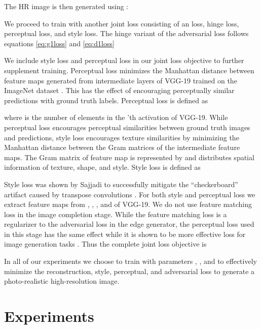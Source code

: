 \documentclass[10pt,twocolumn,letterpaper]{article}
\begin{document}
The HR image is then generated using :

We proceed to train  with another joint loss consisting of an  loss, hinge loss, perceptual loss, and style loss. The hinge variant of the adversarial loss follows equations \ref{eq:g1loss} and \ref{eq:d1loss}

 
We include style loss  and perceptual loss  \cite{gatys2016image, johnson2016perceptual} in our joint loss objective to further supplement training. Perceptual loss minimizes the Manhattan distance between feature maps generated from intermediate layers of VGG-19 trained on the ImageNet dataset \cite{russakovsky2015imagenet}. This has the effect of encouraging perceptually similar predictions with ground truth labels. Perceptual loss is defined as 


where  is the number of elements in the 'th activation of VGG-19. While perceptual loss encourages perceptual similarities between ground truth images and predictions, style loss encourages texture similarities by minimizing the Manhattan distance between the Gram matrices of the intermediate feature maps. The Gram matrix of feature map  is represented by  \cite{gatys2016image} and distributes spatial information of texture, shape, and style. Style loss is defined as 


Style loss was shown by Sajjadi \etal \cite{sajjadi2017enhancenet} to successfully mitigate the ``checkerboard'' artifact caused by transpose convolutions \cite{odena2016deconvolution}. For both style and perceptual loss we extract feature maps from , , ,  and  of VGG-19. We do not use feature matching loss in the image completion stage. While the feature matching loss is a regularizer to the adversarial loss in the edge generator, the perceptual loss used in this stage has the same effect while it is shown to be more effective loss for image generation tasks \cite{nazeri2019edgeconnect,sajjadi2017enhancenet,johnson2016perceptual,johnson2016perceptual}. Thus the complete joint loss objective is  

In all of our experiments we choose to train with parameters , , and  to effectively minimize the reconstruction, style, perceptual, and adversarial loss to generate a photo-realistic high-resolution image.

\section{Experiments}
\end{document}
